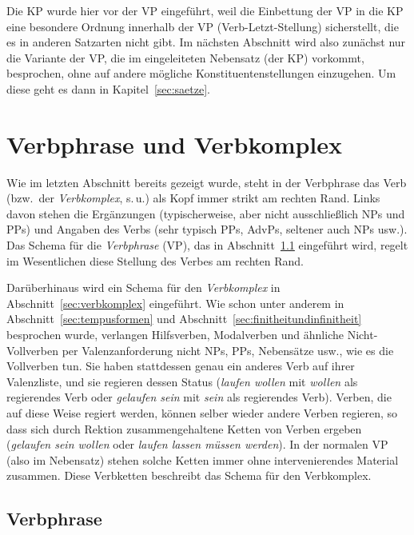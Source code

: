 Die KP wurde hier vor der VP eingeführt, weil die Einbettung der VP in die KP eine besondere Ordnung innerhalb der VP (Verb-Letzt-Stellung) sicherstellt, die es in anderen Satzarten nicht gibt.
Im nächsten Abschnitt wird also zunächst nur die Variante der VP, die im eingeleiteten Nebensatz (der KP) vorkommt, besprochen, ohne auf andere mögliche Konstituentenstellungen einzugehen.
Um diese geht es dann in Kapitel~\ref{sec:saetze}.


\section{Verbphrase und Verbkomplex}
\label{sec:verbphraseundverbkomplex}

Wie im letzten Abschnitt bereits gezeigt wurde, steht in der Verbphrase das Verb (bzw.\ der \textit{Verbkomplex}, s.\,u.) als Kopf immer strikt am rechten Rand.
Links davon stehen die Ergänzungen (typischerweise, aber nicht ausschließlich NPs und PPs) und Angaben des Verbs (sehr typisch \zB PPs, AdvPs, seltener auch NPs usw.).
Das Schema für die \textit{Verbphrase} (VP), das in Abschnitt~\ref{sec:verbphrase} eingeführt wird, regelt im Wesentlichen diese Stellung des Verbes am rechten Rand.

Darüberhinaus wird ein Schema für den \textit{Verbkomplex} in Abschnitt~\ref{sec:verbkomplex} eingeführt.
Wie schon unter anderem in Abschnitt~\ref{sec:tempusformen} und Abschnitt~\ref{sec:finitheitundinfinitheit} besprochen wurde, verlangen Hilfsverben, Modalverben und ähnliche Nicht-Vollverben per Valenzanforderung nicht NPs, PPs, Nebensätze usw., wie es die Vollverben tun.
Sie haben stattdessen genau ein anderes Verb auf ihrer Valenzliste, und sie regieren dessen Status (\zB \textit{laufen wollen} mit \textit{wollen} als regierendes Verb oder \textit{gelaufen sein} mit \textit{sein} als regierendes Verb).
Verben, die auf diese Weise regiert werden, können selber wieder andere Verben regieren, so dass sich durch Rektion zusammengehaltene Ketten von Verben ergeben (\zB \textit{gelaufen sein wollen} oder \textit{laufen lassen müssen werden}).
In der normalen VP (also im Nebensatz) stehen solche Ketten immer ohne intervenierendes Material zusammen.
Diese Verbketten beschreibt das Schema für den Verbkomplex.

\subsection{Verbphrase}
\label{sec:verbphrase}

